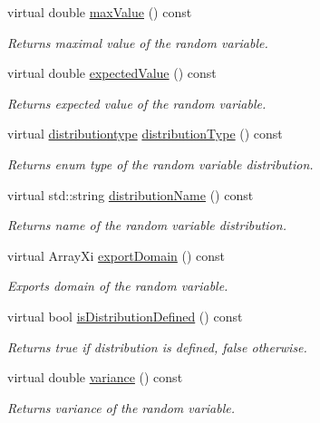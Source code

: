 \begin{DoxyCompactItemize}
virtual double \hyperlink{class_c_empirical_d_r_v_a9831b815323ea8a6a60f68eda50294d8}{max\-Value} () const 
\begin{DoxyCompactList}\small\item\em Returns maximal value of the random variable. \end{DoxyCompactList}\item 
virtual double \hyperlink{class_c_empirical_d_r_v_a0d952cfaf3190a59525b774de4a1f2e3}{expected\-Value} () const 
\begin{DoxyCompactList}\small\item\em Returns expected value of the random variable. \end{DoxyCompactList}\item 
virtual \hyperlink{class_c_random_variable_a80d2a87c43847274138b51f7d713d7f1}{distributiontype} \hyperlink{class_c_empirical_d_r_v_a14227ae88985f6cdd28f7ccd3fa734e7}{distribution\-Type} () const 
\begin{DoxyCompactList}\small\item\em Returns enum type of the random variable distribution. \end{DoxyCompactList}\item 
virtual std\-::string \hyperlink{class_c_empirical_d_r_v_acfea0ba8ae0a961a27869ce8e966ba4d}{distribution\-Name} () const 
\begin{DoxyCompactList}\small\item\em Returns name of the random variable distribution. \end{DoxyCompactList}\item 
virtual Array\-Xi \hyperlink{class_c_empirical_d_r_v_a896eab1e119e990165bca4ffcb5dc7b6}{export\-Domain} () const 
\begin{DoxyCompactList}\small\item\em Exports domain of the random variable. \end{DoxyCompactList}\item 
virtual bool \hyperlink{class_c_empirical_d_r_v_a54549be13650697081979ee7ea7aae6c}{is\-Distribution\-Defined} () const 
\begin{DoxyCompactList}\small\item\em Returns true if distribution is defined, false otherwise. \end{DoxyCompactList}\item 
virtual double \hyperlink{class_c_empirical_d_r_v_a65bc76e9a58f20e0e6eec0f036e469f5}{variance} () const 
\begin{DoxyCompactList}\small\item\em Returns variance of the random variable. \end{DoxyCompactList}\end{DoxyCompactItemize}
